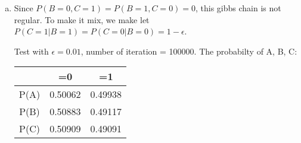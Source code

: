 \documentclass{article}
\theoremstyle{quest}
\begin{document}
\begin{enumerate}
\begin{enumerate}[a.]
\begin{proof}
	For $B=1$, $P(B=1|A=1, C=0) = P(C=0|B=1) = 0$.
	
	Thus $B^1 =0$, then we have $C^1=0$. No matter what $A^1$ is, we still get $B^2=0, C^2=0$ (Because $P(A=0)=P(A=1)=P(B=0|A=1)=P(B=0|A=0)=P(B=1|A=0)=P(B=1|A=1)=0.5$). By induction $P(B)^{t\rightarrow \infty} = 0$
	\qedhere
	\end{proof}
	\item
	Since $P(B=0, C=1) = P(B=1,C=0) = 0$, this gibbs chain is not regular. To make it mix, we make let $P(C=1|B=1)=P(C=0|B=0)= 1- \epsilon$.
	
	Test with $\epsilon = 0.01$, number of iteration = 100000. The probabilty of A, B, C:
	
	\begin{tabular}{ccc}
	\hline
	& =0 & =1\\ \hline
	P(A) & 0.50062  & 0.49938 \\
 P(B)& 0.50883  &0.49117 \\
  P(C)&0.50909  &0.49091 \\ \hline
  
	\end{tabular}
	
	\end{enumerate}
\end{enumerate}
\end{document}
